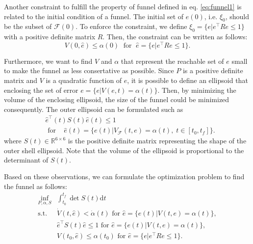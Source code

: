 \documentclass[letterpaper, 10 pt, conference]{ieeeconf}  %
\begin{document}
Another constraint to fulfill the property of funnel defined in eq. \eqref{eq:funnel1} is related to the initial condition of a funnel. 
The initial set of $e(0)$, i.e. $\xi_0$, should be the subset of $\mathcal{F}(0)$. 
To enforce the constraint, we define $\xi_0 = \{e|e^\top R e \leq 1\}$ with a positive definite matrix $R$. Then, the constraint can be written as follows:
\begin{equation}
V(0,\hat{e}) \leq \alpha(0)\;\text{ for }\;\hat{e} = \{e |e^\top R e \leq 1\}.
\end{equation} 

Furthermore, we want to find $V$ and $\alpha$ that represent the reachable set of $e$ small to make the funnel as less consertative as possible. 
Since $P$ is a positive definite matrix and $V$ is a quadratic function of $e$, 
it is possible to define an ellipsoid that enclosing the set of error $e=\{e|V(e,t) = \alpha(t) \}$.
Then, by minimizing the volume of the enclosing ellipsoid, the size of the funnel could be minimized consequently.
The outer ellipsoid can be formulated such as
\begin{align}
&\hat{e}^\top(t) S(t) \hat{e}(t) \leq 1  \nonumber \\
&\text{ for }\;\;\;\hat{e}(t) = \{e(t)|V_\mathcal{F}(t,e) = \alpha(t),\;t \in [t_0,t_f]\}. \nonumber
\end{align}
where $S(t)\in \mathbb{R}^{6\times 6}$ is the positive definite matrix representing the shape of the outer shell ellipsoid. Note that the volume of the ellipsoid is proportional to the determinant of $S(t)$.

Based on these observations, we can formulate the optimization problem to find the funnel as follows:
\begin{equation}
\begin{array}{rl}
\displaystyle{\inf_{P,\alpha,S}} & \int_{t_0}^{t_f} \det{S(t)}\text{d}t \label{eq:optim1} \\
\displaystyle{\text{s.t.}}& \dot{V}(t,\hat{e}) < \dot{\alpha}(t)\text{ for }\hat{e} = \{e(t)|V(t,e) = \alpha(t)\}, \nonumber \\
& \hat{e}^\top S(t) \hat{e} \leq 1\text{ for }\hat{e} = \{e(t)|V(t,e) = \alpha(t)\}, \nonumber \\
& V(t_0,\hat{e}) \leq \alpha(t_0)\text{ for }\hat{e} = \{e|e^\top R e \leq 1\}. \nonumber
\end{array}
\end{equation}
\end{document}
